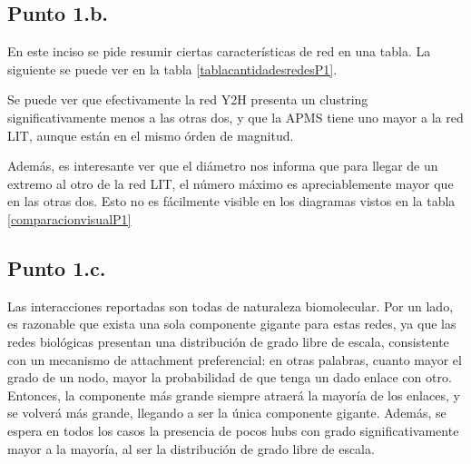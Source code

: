 \documentclass{article}
\begin{document}
\subsection{Punto 1.b.}
En este inciso se pide resumir ciertas características de red en una tabla. La siguiente se puede ver en la tabla \ref{tablacantidadesredesP1}.

\begin{table}[ht]
\caption{Cantidades de red asociadas a las redes correspondientes.}
\centering
{}
\label{tablacantidadesredesP1}
\end{table}

Se puede ver que efectivamente la red Y2H presenta un clustring significativamente menos a las otras dos, y que la APMS tiene uno mayor a la red LIT, aunque están en el mismo órden de magnitud.

Además, es interesante ver que el diámetro nos informa que para llegar de un extremo al otro de la red LIT, el número máximo es apreciablemente mayor que en las otras dos. Esto no es fácilmente visible en los diagramas vistos en la tabla \ref{comparacionvisualP1}

\subsection{Punto 1.c.}

Las interacciones reportadas son todas de naturaleza biomolecular. Por un lado, es razonable que exista una sola componente gigante para estas redes, ya que las redes biológicas presentan una distribución de grado libre de escala, consistente con un mecanismo de attachment preferencial: en otras palabras, cuanto mayor el grado de un nodo, mayor la probabilidad de que tenga un dado enlace con otro. Entonces, la componente más grande siempre atraerá la mayoría de los enlaces, y se volverá más grande, llegando a ser la única componente gigante. Además, se espera en todos los casos la presencia de pocos hubs con grado significativamente mayor a la mayoría, al ser la distribución de grado libre de escala.
\end{document}
